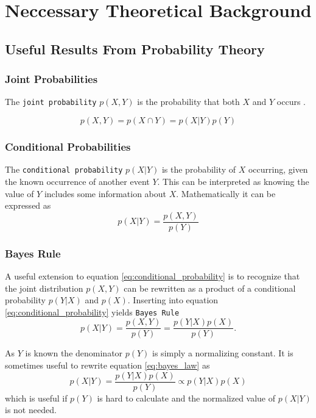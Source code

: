 \chapter{Neccessary Theoretical Background}

\section{Useful Results From Probability Theory}
 
\subsection{Joint Probabilities}
The \texttt{joint probability} $p(X, Y)$ is the probability that both $X$ and $Y$ occurs \cite[p.~29]{murphy}.

\begin{equation}
    p(X, Y) = p(X \cap Y) = p(X | Y)p(Y)
\end{equation}

\subsection{Conditional Probabilities}
The \texttt{conditional probability} $p(X | Y)$ is the probability of $X$ occurring, given the known occurrence of another event $Y$. This can be interpreted as knowing the value of $Y$ includes some information about $X$. Mathematically it can be expressed as \cite[p.~29]{murphy}
\begin{equation}\label{eq:conditional_probability}
    p(X | Y) = \frac{p(X, Y)}{p(Y)}
\end{equation}

\subsection{Bayes Rule}

A useful extension to equation \eqref{eq:conditional_probability} is to recognize that the joint distribution $p(X, Y)$ can be rewritten as a product of a conditional probability $p(Y | X)$ and $p(X)$. Inserting into equation \eqref{eq:conditional_probability} yields \texttt{Bayes Rule}
\begin{equation}\label{eq:bayes_law}
    p(X | Y) = \frac{p(X, Y)}{p(Y)} = \frac{p(Y | X)p(X)}{p(Y)}.
\end{equation}

As $Y$ is known the denominator $p(Y)$ is simply a normalizing constant. It is sometimes useful to rewrite equation \eqref{eq:bayes_law} as
\begin{equation}\label{eq:bayes_law_proportional}
    p(X | Y) = \frac{p(Y | X) p(X)}{p(Y)} \propto p(Y | X)p(X)
\end{equation} 
which is useful if $p(Y)$ is hard to calculate and the normalized value of $p(X | Y)$ is not needed.

